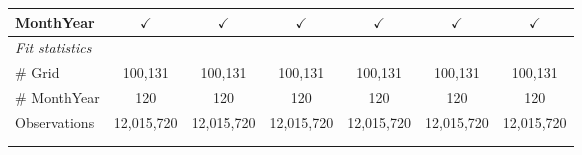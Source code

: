 \begin{table}[htbp]
\begin{tabular}{lcccccc}
      MonthYear                        & $\checkmark$  & $\checkmark$  & $\checkmark$  & $\checkmark$  & $\checkmark$  & $\checkmark$\\   
      \midrule
      \emph{Fit statistics}\\
      \# Grid                          & 100,131       & 100,131       & 100,131       & 100,131       & 100,131       & 100,131\\  
      \# MonthYear                     & 120           & 120           & 120           & 120           & 120           & 120\\  
      Observations                     & 12,015,720    & 12,015,720    & 12,015,720    & 12,015,720    & 12,015,720    & 12,015,720\\  
      \midrule \midrule
                                       &               &               &               &               &               &  \tabularnewline 
      \\
   \end{tabular}
\end{table}


